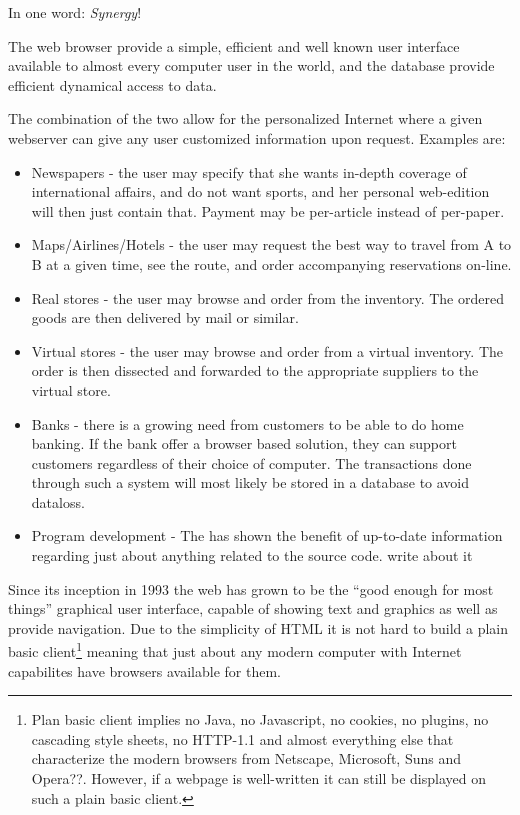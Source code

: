 In one word: \textit{Synergy}!

The web browser provide a simple, efficient and
well known user interface available to almost every computer user in
the world, and the database provide efficient dynamical access to
data.

The combination of the two allow for the personalized Internet where a
given webserver can give any user customized information upon request.
Examples are:

\begin{itemize}
\item Newspapers - the user may specify that she wants in-depth
  coverage of international affairs, and do not want sports, and her
  personal web-edition will then just contain that.  Payment may be
  per-article instead of per-paper.
\item Maps/Airlines/Hotels - the user may request the best way to
travel from A to B at a given time, see the route, and order
accompanying reservations on-line.
\item Real stores - the user may browse and order from the inventory.
  The ordered goods are then delivered by mail or similar.
\item Virtual stores - the user may browse and order from a virtual
  inventory.  The order is then dissected and forwarded to the
  appropriate suppliers to the virtual store.

\item Banks - there is a growing need from customers to be able to do
  home banking.  If the bank offer a browser based solution, they can
  support customers regardless of their choice of computer.  The
  transactions done through such a system will most likely be stored
  in a database to avoid dataloss.
\item Program development - The  has shown the benefit of up-to-date information regarding
  just about anything related to the source code.  \textsf{write about
    it}
\end{itemize}


Since its inception in 1993 the web has grown to be the ``good enough
for most things'' graphical user interface, capable of showing text
and graphics as well as provide navigation.  Due to the simplicity of
HTML it is not hard to build a plain basic client\footnote{Plan basic
  client implies no Java, no Javascript, no cookies, no plugins, no
  cascading style sheets, no HTTP-1.1 and almost everything else that
  characterize the modern browsers from Netscape, Microsoft, Suns and
  Opera\textsf{??}.  However, if a webpage is well-written it can still
  be displayed on such a plain basic client. } meaning that just about
any modern computer with Internet capabilites have browsers available
for them.




